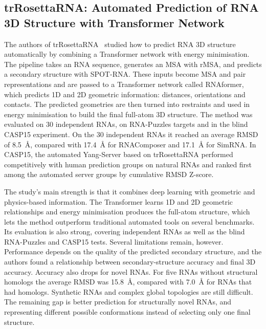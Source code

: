 \documentclass{FastFyp}
\begin{document}
\subsection{trRosettaRNA: Automated Prediction of RNA 3D Structure with Transformer Network}
The authors of trRosettaRNA~\cite{wang2023trrosettarna} studied how to predict RNA 3D structure automatically by combining a Transformer network with energy minimisation. The pipeline takes an RNA sequence, generates an MSA with rMSA, and predicts a secondary structure with SPOT-RNA. These inputs become MSA and pair representations and are passed to a Transformer network called RNAformer, which predicts 1D and 2D geometric information: distances, orientations and contacts. The predicted geometries are then turned into restraints and used in energy minimisation to build the final full-atom 3D structure. The method was evaluated on 30 independent RNAs, on RNA-Puzzles targets and in the blind CASP15 experiment. On the 30 independent RNAs it reached an average RMSD of 8.5~\AA{}, compared with 17.4~\AA{} for RNAComposer and 17.1~\AA{} for SimRNA. In CASP15, the automated Yang-Server based on trRosettaRNA performed competitively with human prediction groups on natural RNAs and ranked first among the automated server groups by cumulative RMSD Z-score.

The study's main strength is that it combines deep learning with geometric and physics-based information. The Transformer learns 1D and 2D geometric relationships and energy minimisation produces the full-atom structure, which lets the method outperform traditional automated tools on several benchmarks. Its evaluation is also strong, covering independent RNAs as well as the blind RNA-Puzzles and CASP15 tests. Several limitations remain, however. Performance depends on the quality of the predicted secondary structure, and the authors found a relationship between secondary-structure accuracy and final 3D accuracy. Accuracy also drops for novel RNAs. For five RNAs without structural homologs the average RMSD was 15.8~\AA{}, compared with 7.0~\AA{} for RNAs that had homologs. Synthetic RNAs and complex global topologies are still difficult. The remaining gap is better prediction for structurally novel RNAs, and representing different possible conformations instead of selecting only one final structure.
\end{document}

